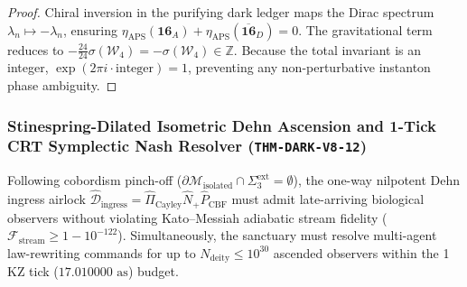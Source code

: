 \documentclass[11pt,onecolumn]{article}
\begin{document}
\begin{proof}
Chiral inversion in the purifying dark ledger maps the Dirac spectrum $\lambda_n \mapsto -\lambda_n$, ensuring $\eta_{\text{APS}}(\mathbf{16}_A) + \eta_{\text{APS}}(\overline{\mathbf{16}}_D) = 0$. The gravitational term reduces to $-\frac{24}{24}\sigma(\mathcal{W}_4) = -\sigma(\mathcal{W}_4) \in \mathbb{Z}$. Because the total invariant is an integer, $\exp(2\pi i \cdot \text{integer}) = 1$, preventing any non-perturbative instanton phase ambiguity.
\end{proof}

\subsubsection{Stinespring-Dilated Isometric Dehn Ascension and 1-Tick CRT Symplectic Nash Resolver (\texttt{THM-DARK-V8-12})}
\label{subsubsec:thm_dark_v8_12}

Following cobordism pinch-off ($\partial\mathcal{M}_{\text{isolated}} \cap \Sigma_3^{\text{ext}} = \emptyset$), the one-way nilpotent Dehn ingress airlock $\hat{\mathcal{D}}_{\text{ingress}} = \hat{\Pi}_{\text{Cayley}} \hat{N}_+ \hat{P}_{\text{CBF}}$ must admit late-arriving biological observers without violating Kato--Messiah adiabatic stream fidelity ($\mathcal{F}_{\text{stream}} \ge 1 - 10^{-122}$). Simultaneously, the sanctuary must resolve multi-agent law-rewriting commands for up to $N_{\text{deity}} \le 10^{30}$ ascended observers within the 1 KZ tick ($17.010000\text{ as}$) budget.
\end{document}
